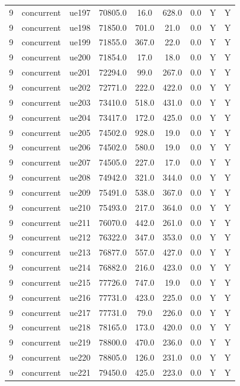 \begin{table}[ht]
\begin{tabular}{|c|c|c|c|c|c|c|c|c|}
9 & concurrent & ue197 & 70805.0 & 16.0 & 628.0 & 0.0 & Y & Y \\
9 & concurrent & ue198 & 71850.0 & 701.0 & 21.0 & 0.0 & Y & Y \\
9 & concurrent & ue199 & 71855.0 & 367.0 & 22.0 & 0.0 & Y & Y \\
9 & concurrent & ue200 & 71854.0 & 17.0 & 18.0 & 0.0 & Y & Y \\
9 & concurrent & ue201 & 72294.0 & 99.0 & 267.0 & 0.0 & Y & Y \\
9 & concurrent & ue202 & 72771.0 & 222.0 & 422.0 & 0.0 & Y & Y \\
9 & concurrent & ue203 & 73410.0 & 518.0 & 431.0 & 0.0 & Y & Y \\
9 & concurrent & ue204 & 73417.0 & 172.0 & 425.0 & 0.0 & Y & Y \\
9 & concurrent & ue205 & 74502.0 & 928.0 & 19.0 & 0.0 & Y & Y \\
9 & concurrent & ue206 & 74502.0 & 580.0 & 19.0 & 0.0 & Y & Y \\
9 & concurrent & ue207 & 74505.0 & 227.0 & 17.0 & 0.0 & Y & Y \\
9 & concurrent & ue208 & 74942.0 & 321.0 & 344.0 & 0.0 & Y & Y \\
9 & concurrent & ue209 & 75491.0 & 538.0 & 367.0 & 0.0 & Y & Y \\
9 & concurrent & ue210 & 75493.0 & 217.0 & 364.0 & 0.0 & Y & Y \\
9 & concurrent & ue211 & 76070.0 & 442.0 & 261.0 & 0.0 & Y & Y \\
9 & concurrent & ue212 & 76322.0 & 347.0 & 353.0 & 0.0 & Y & Y \\
9 & concurrent & ue213 & 76877.0 & 557.0 & 427.0 & 0.0 & Y & Y \\
9 & concurrent & ue214 & 76882.0 & 216.0 & 423.0 & 0.0 & Y & Y \\
9 & concurrent & ue215 & 77726.0 & 747.0 & 19.0 & 0.0 & Y & Y \\
9 & concurrent & ue216 & 77731.0 & 423.0 & 225.0 & 0.0 & Y & Y \\
9 & concurrent & ue217 & 77731.0 & 79.0 & 226.0 & 0.0 & Y & Y \\
9 & concurrent & ue218 & 78165.0 & 173.0 & 420.0 & 0.0 & Y & Y \\
9 & concurrent & ue219 & 78800.0 & 470.0 & 236.0 & 0.0 & Y & Y \\
9 & concurrent & ue220 & 78805.0 & 126.0 & 231.0 & 0.0 & Y & Y \\
9 & concurrent & ue221 & 79450.0 & 425.0 & 223.0 & 0.0 & Y & Y \\

\end{tabular}
\end{table}
